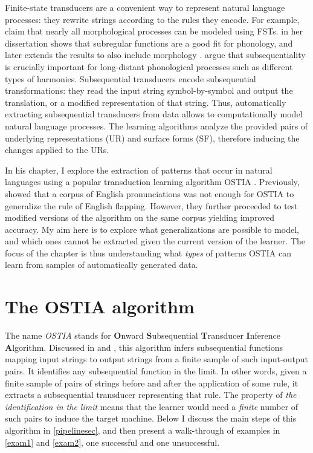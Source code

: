 Finite-state transducers are a convenient way to represent natural language processes: they rewrite strings according to the rules they encode.
For example, \cite{RoarkSproat2007} claim that nearly all morphological processes can be modeled using FSTs.
\cite{Chandlee2014} in her dissertation shows that subregular functions are a good fit for phonology, and later extends the results to also include morphology \citep{Chandlee2017}.
\cite{Heinz-Lai-2013-VHS} argue that subsequentiality is crucially important for long-distant phonological processes such as different types of harmonies.
Subsequential transducers encode subsequential transformations: they read the input string symbol-by-symbol and output the translation, or a modified representation of that string.
Thus, automatically extracting subsequential transducers from data allows to computationally model natural language processes.
The learning algorithms analyze the provided pairs of underlying representations (UR) and surface forms (SF), therefore inducing the changes applied to the URs.

In his chapter, I explore the extraction of patterns that occur in natural languages using a popular transduction learning algorithm OSTIA \citep{OncinaEtAl1993}.
Previously, \cite{GildeaJurafsky1996} showed that a corpus of English pronunciations was not enough for OSTIA to generalize the rule of English flapping.
However, they further proceeded to test modified versions of the algorithm on the same corpus yielding improved accuracy.
My aim here is to explore what generalizations are possible to model, and which ones cannot be extracted given the current version of the learner.
The focus of the chapter is thus understanding what \emph{types} of patterns OSTIA can learn from samples of automatically generated data.


\section{The OSTIA algorithm}

The name \emph{OSTIA} stands for \textbf{O}nward  \textbf{S}ubsequential \textbf{T}ransducer \textbf{I}nference \textbf{A}lgorithm.
Discussed in \cite{OncinaEtAl1993} and \cite{DeLaHiguera2010}, this algorithm infers subsequential functions mapping input strings to output strings from a finite sample of such input-output pairs.
It identifies any subsequential function in the limit.
In other words, given a finite sample of pairs of strings before and after the application of some rule, it extracts a subsequential transducer representing that rule.
The property of \emph{the identification in the limit} means that the learner would need a \emph{finite} number of such pairs to induce the target machine.
Below I discuss the main steps of this algorithm in \ref{pipelinesec}, and then present a walk-through of examples in \ref{exam1} and \ref{exam2}, one successful and one unsuccessful.

